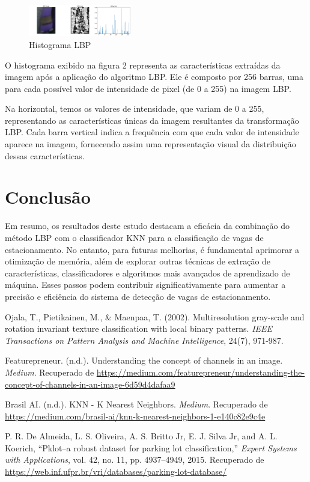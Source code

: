 \documentclass[lettersize,journal]{IEEEtran}
\begin{document}
\begin{figure}[h]
    \centering
    \includegraphics[width=0.4\textwidth]{histogram.png}
    \caption{Histograma LBP}
\end{figure}

O histograma exibido na figura 2 representa as características extraídas da imagem após a aplicação do algoritmo LBP. Ele é composto por 256 barras, uma para cada possível valor de intensidade de pixel (de 0 a 255) na imagem LBP.

Na horizontal, temos os valores de intensidade, que variam de 0 a 255, representando as características únicas da imagem resultantes da transformação LBP. Cada barra vertical indica a frequência com que cada valor de intensidade aparece na imagem, fornecendo assim uma representação visual da distribuição dessas características.


\section{Conclusão}
Em resumo, os resultados deste estudo destacam a eficácia da combinação do método LBP com o classificador KNN para a classificação de vagas de estacionamento. No entanto, para futuras melhorias, é fundamental aprimorar a otimização de memória, além de explorar outras técnicas de extração de características, classificadores e algoritmos mais avançados de aprendizado de máquina. Esses passos podem contribuir significativamente para aumentar a precisão e eficiência do sistema de detecção de vagas de estacionamento.

\begin{thebibliography}{1}

Ojala, T., Pietikainen, M., \& Maenpaa, T. (2002). Multiresolution gray-scale and rotation invariant texture classification with local binary patterns. \textit{IEEE Transactions on Pattern Analysis and Machine Intelligence}, 24(7), 971-987.

Featurepreneur. (n.d.). Understanding the concept of channels in an image. \textit{Medium}. Recuperado de \url{https://medium.com/featurepreneur/understanding-the-concept-of-channels-in-an-image-6d59d4dafaa9}

Brasil AI. (n.d.). KNN - K Nearest Neighbors. \textit{Medium}. Recuperado de \url{https://medium.com/brasil-ai/knn-k-nearest-neighbors-1-e140c82e9c4e}

P. R. De Almeida, L. S. Oliveira, A. S. Britto Jr, E. J. Silva Jr, and A. L. Koerich, “Pklot–a robust dataset for parking lot classification,” \textit{Expert Systems with Applications}, vol. 42, no. 11, pp. 4937–4949, 2015. Recuperado de \url{https://web.inf.ufpr.br/vri/databases/parking-lot-database/}

\end{thebibliography}
\end{document}
